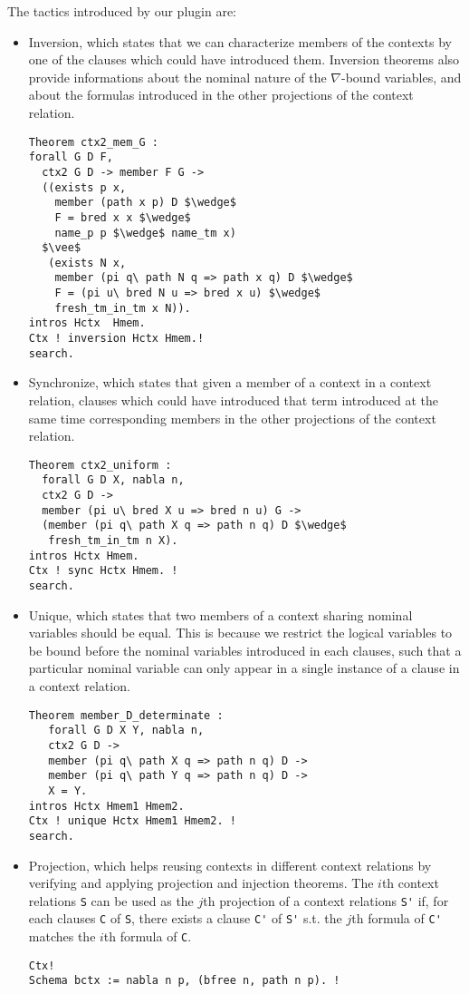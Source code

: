 \documentclass[nocopyrightspace,authoryear]{sigplanconf}
\begin{document}
The tactics introduced by our plugin are:
\begin{itemize}
\item Inversion, which states that we can characterize members of the contexts by one of the clauses which could have introduced them. Inversion theorems also provide informations about the nominal nature of the $\nabla$-bound variables, and about the formulas introduced in the other projections of the context relation.

\begin{lstlisting}
Theorem ctx2_mem_G :
forall G D F,
  ctx2 G D -> member F G ->
  ((exists p x, 
    member (path x p) D $\wedge$
    F = bred x x $\wedge$  
    name_p p $\wedge$ name_tm x)
  $\vee$
   (exists N x, 
    member (pi q\ path N q => path x q) D $\wedge$ 
    F = (pi u\ bred N u => bred x u) $\wedge$  
    fresh_tm_in_tm x N)).
intros Hctx  Hmem. 
Ctx ! inversion Hctx Hmem.! 
search.
\end{lstlisting}

\item Synchronize, which states that given a member of a context in a context relation, clauses which could have introduced that term introduced at the same time corresponding members in the other projections of the context relation.
\begin{lstlisting}
Theorem ctx2_uniform :
  forall G D X, nabla n,
  ctx2 G D ->
  member (pi u\ bred X u => bred n u) G ->
  (member (pi q\ path X q => path n q) D $\wedge$ 
   fresh_tm_in_tm n X).
intros Hctx Hmem. 
Ctx ! sync Hctx Hmem. ! 
search.
\end{lstlisting}

\item Unique, which states that two members of a context sharing nominal variables should be equal. This is because we restrict the logical variables to be bound before the nominal variables introduced in each clauses, such that a particular nominal variable can only appear in a single instance of a clause in a context relation.   

\begin{lstlisting}
Theorem member_D_determinate :
   forall G D X Y, nabla n,
   ctx2 G D ->
   member (pi q\ path X q => path n q) D ->
   member (pi q\ path Y q => path n q) D ->
   X = Y.
intros Hctx Hmem1 Hmem2. 
Ctx ! unique Hctx Hmem1 Hmem2. ! 
search.
\end{lstlisting}

\item Projection, which helps reusing contexts in different context relations by verifying and applying projection and injection theorems. The $i$th context relations \lstinline|S| can be used as the $j$th projection of a context relations \lstinline|S'| if, for each clauses \lstinline|C| of \lstinline|S|, there exists a clause \lstinline|C'| of \lstinline|S'| s.t. the $j$th formula of \lstinline|C'| matches the $i$th formula of \lstinline|C|.
\begin{lstlisting}
Ctx!
Schema bctx := nabla n p, (bfree n, path n p). !



\end{lstlisting}
\end{itemize}
\end{document}
